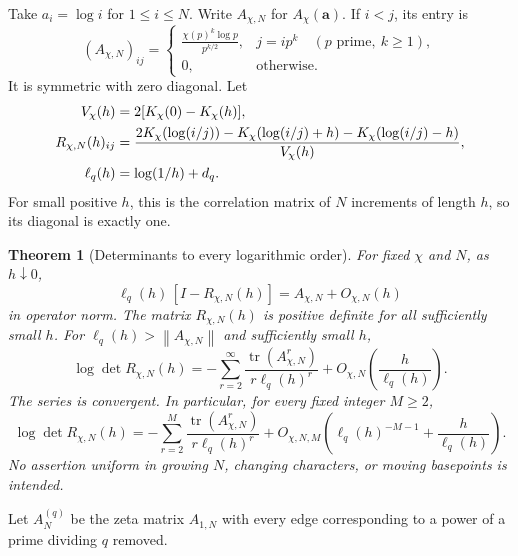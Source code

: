 \documentclass[11pt]{article}
\newtheorem{theorem}{Theorem}[section]
\theoremstyle{definition}
\newcommand{\tr}{\operatorname{tr}}
\newcommand{\norm}[1]{\left\|#1\right\|}
\begin{document}
Take $a_i=\log i$ for $1\le i\le N$. Write $A_{\chi,N}$ for $A_\chi(\bm a)$.
If $i<j$, its entry is
\begin{equation}\label{eq:Amatrix}
 (A_{\chi,N})_{ij}=\begin{cases}
 \displaystyle\frac{\chi(p)^k\log p}{p^{k/2}},&j=i p^k\quad(p\text{ prime},\ k\ge1),\\
 0,&\text{otherwise}.
 \end{cases}
\end{equation}
It is symmetric with zero diagonal. Let
\begin{align}\label{eq:correlation}
 V_\chi(h)&=2[K_\chi(0)-K_\chi(h)],\notag\\
 R_{\chi,N}(h)_{ij}
 &=\frac{2K_\chi(\log(i/j))-K_\chi(\log(i/j)+h)-K_\chi(\log(i/j)-h)}{V_\chi(h)},\notag\\
 \ell_q(h)&=\log(1/h)+d_q.
\end{align}
For small positive $h$, this is the correlation matrix of $N$ increments of
length $h$, so its diagonal is exactly one.

\begin{theorem}[Determinants to every logarithmic order]\label{thm:det}
For fixed $\chi$ and $N$, as $h\downarrow0$,
\begin{equation}\label{eq:matrixlimit}
 \ell_q(h)\,[I-R_{\chi,N}(h)]=A_{\chi,N}+O_{\chi,N}(h)
\end{equation}
in operator norm. The matrix $R_{\chi,N}(h)$ is positive definite for all sufficiently
small $h$. For $\ell_q(h)>\norm{A_{\chi,N}}$ and sufficiently small $h$,
\begin{equation}\label{eq:detinfinite}
 \log\det R_{\chi,N}(h)
 =-\sum_{r=2}^{\infty}\frac{\tr(A_{\chi,N}^r)}{r\ell_q(h)^r}
   +O_{\chi,N}\left(\frac h{\ell_q(h)}\right).
\end{equation}
The series is convergent. In particular, for every fixed integer $M\ge2$,
\begin{equation}\label{eq:detfinite}
 \log\det R_{\chi,N}(h)
 =-\sum_{r=2}^{M}\frac{\tr(A_{\chi,N}^r)}{r\ell_q(h)^r}
 +O_{\chi,N,M}\left(\ell_q(h)^{-M-1}+\frac h{\ell_q(h)}\right).
\end{equation}
No assertion uniform in growing $N$, changing characters, or moving basepoints
is intended.
\end{theorem}

Let $A_N^{(q)}$ be the zeta matrix $A_{1,N}$ with every edge corresponding to a
power of a prime dividing $q$ removed.
\end{document}
